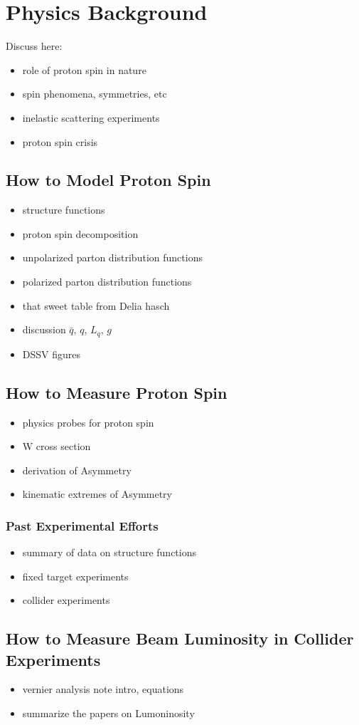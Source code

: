 \chapter{Physics Background}
Discuss here:
\begin{itemize}
		\item role of proton spin in nature
		\item spin phenomena, symmetries, etc
		\item inelastic scattering experiments
		\item proton spin crisis
\end{itemize}
\section{How to Model Proton Spin}
\begin{itemize}
		\item structure functions
		\item proton spin decomposition
		\item unpolarized parton distribution functions
		\item polarized parton distribution functions
		\item that sweet table from Delia hasch
		\item discussion $\bar{q}$, $q$, $L_q$, $g$
		\item DSSV figures
\end{itemize}
\section{How to Measure Proton Spin}
\begin{itemize}
		\item physics probes for proton spin
		\item W cross section
		\item derivation of Asymmetry
		\item kinematic extremes of Asymmetry
\end{itemize}
\subsection{Past Experimental Efforts}
\begin{itemize}
		\item summary of data on structure functions
		\item fixed target experiments
		\item collider experiments
\end{itemize}

\section{How to Measure Beam Luminosity in Collider Experiments}
\begin{itemize}
		\item vernier analysis note intro, equations
		\item summarize the papers on Lumoninosity
\end{itemize}

